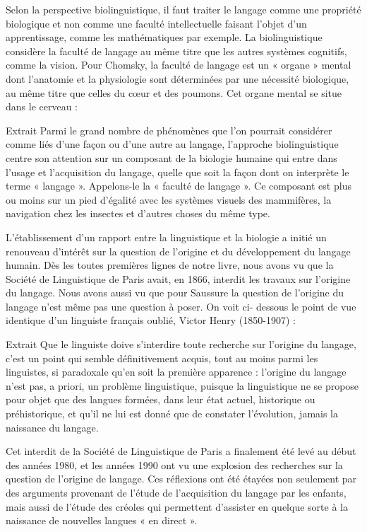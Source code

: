 Selon la perspective biolinguistique, il faut traiter le langage comme une propriété biologique et
non comme une faculté intellectuelle faisant l'objet d'un apprentissage, comme les mathématiques
par exemple. La biolinguistique considère la faculté de langage au même titre que les autres
systèmes cognitifs, comme la vision. Pour Chomsky, la faculté de langage est un « organe » mental
dont l'anatomie et la physiologie sont déterminées par une nécessité biologique, au même titre que
celles du cœur et des poumons. Cet organe mental se situe dans le cerveau :
\begin{lecture}{Extrait}
Parmi le grand nombre de phénomènes que l'on pourrait considérer comme liés d'une façon ou d'une autre au langage, l'approche biolinguistique centre son attention sur un composant de la biologie humaine qui entre dans l'usage et l'acquisition du langage, quelle que soit la façon dont on interprète le terme « langage ». Appelons-le la « faculté de langage ». Ce composant est plus ou moins sur un pied d'égalité avec les systèmes visuels des mammifères, la navigation chez les insectes et d'autres choses du même type.
\end{lecture}
L'établissement d’un rapport entre la linguistique et la biologie a initié un renouveau d'intérêt sur
la question de l’origine et du développement du langage humain.
Dès les toutes premières lignes de notre livre, nous avons vu que la Société de Linguistique de
Paris avait, en 1866, interdit les travaux sur l'origine du langage. Nous avons aussi vu que pour
Saussure la question de l’origine du langage n'est même pas une question à poser. On voit ci-
dessous le point de vue identique d’un linguiste français oublié, Victor Henry (1850-1907) :
\begin{lecture}{Extrait}
Que le linguiste doive s'interdire toute recherche sur l'origine du langage, c'est un point qui semble définitivement acquis, tout au moins parmi les linguistes, si paradoxale qu'en soit la première apparence : l'origine du langage n'est pas, a priori, un problème linguistique, puisque la linguistique ne se propose pour objet que des langues formées, dans leur état actuel, historique ou préhistorique, et qu'il ne lui est donné que de constater l'évolution, jamais la naissance du langage.
\end{lecture}
Cet interdit de la Société de Linguistique de Paris a finalement été levé au début des années 1980,
et les années 1990 ont vu une explosion des recherches sur la question de l'origine de langage. Ces
réflexions ont été étayées non seulement par des arguments provenant de l'étude de l'acquisition
du langage par les enfants, mais aussi de l'étude des créoles qui permettent d'assister en quelque
sorte à la naissance de nouvelles langues « en direct ».

